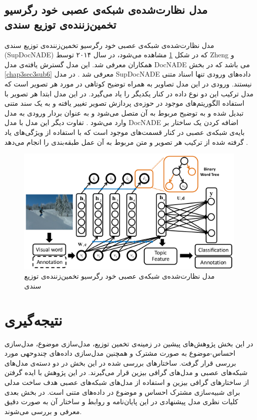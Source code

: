 	\subsection{مدل نظارت‌شده‌ی شبکه‌‌ی عصبی خود رگرسیو تخمین‌زننده‌ی توزیع سندی}
	\label{chap3sec5sub1}
	مدل نظارت‌شده‌ی شبکه‌‌ی عصبی خود رگرسیو تخمین‌زننده‌ی توزیع سندی
	(SupDocNADE)
	 که در شکل 
	\ref{chap3-fig10}
	مشاهده می‌شود، در سال ۲۰۱۴ توسط
	Zheng
	و همکاران
	\cite{zheng2014topic}
	معرفی‌ شد. این مدل گسترش یافته‌ی مدل
	DocNADE
	می‌ باشد که در بخش
	\ref{chap3sec3sub6}
	معرفی‌ شد
	\cite{zheng2014topic}.
	 در مدل
	SupDocNADE
	داده‌های ورودی تنها اسناد متنی نیستند. ورودی در این مدل تصاویر به همراه توضیح کوتاهی‌ در مورد هر تصویر است که مدل ترکیب این دو 
	نوع داده در کنار یکدیگر را یاد می‌‌گیرد. در این مدل ابتدا هر تصویر با استفاده الگوریتم‌های موجود در حوزه‌ی پردازش تصویر تغییر یافته و به یک سند متنی تبدیل شده و به توضیح مربوط به آن متصل می‌شود و به عنوان بردار ورودی به مدل وارد می‌‌شود
	\cite{zheng2014topic}.
	 تفاوت دیگر این مدل با مدل
	DocNADE
	اضافه کردن یک ساختار بر بایه‌ی شبکه‌ی عصبی در کنار قسمت‌های موجود است که با استفاده از ویژگی‌‌های یاد گرفته شده از ترکیب هر تصویر و متن مربوط به آن عمل طبقه‌بندی را انجام می‌‌دهد
\cite{zheng2014topic}.
	
	\begin{figure}[!b]
		\centering
		\includegraphics[scale=0.6]{chap3-img/SupDocNADE}
		\caption{مدل نظارت‌شده‌ی شبکه‌‌ی عصبی خود رگرسیو تخمین‌زننده‌ی توزیع سندی \cite{zheng2014topic}}
		\label{chap3-fig10}
	\end{figure}

\section{نتیجه‌گیری}
در این بخش پژوهش‌های پیشین در زمینه‌ی تخمین توزیع، مدل‌سازی موضوع، مدل‌سازی احساس‌-موضوع به صورت مشترک و همچنین مدل‌سازی داده‌های چندوحهی مورد بررسی‌ قرار گرفت. ساختار‌های بررسی‌ شده در این بخش در دو دسته‌ی مدل‌های شبکه‌های عصبی و مدل‌های گرافی‌ بیزین قرار می‌‌گیرند. در این پژوهش با ایده‌
گرفتن از ساختار‌های گرافی بیزین و استفاده از مدل‌های شبکه‌های عصبی هدف ساخت مدلی‌ برای شبیه‌سازی مشترک احساس و موضوع در داده‌های متنی است. در بخش بعدی کلیات نظری مدل پیشنهادی در این پایان‌‌نامه و روابط و ساختار آن به صورت دقیق معرفی‌ و بررسی‌ می‌‌شوند.
 